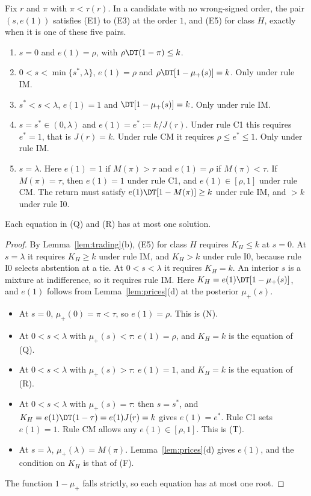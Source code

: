 \begin{lemma}\label{lem:a4-high}
Fix \(r\) and \(\pi\) with \(\pi<\tau(r)\). In a candidate with no wrong-signed order, the pair \((s,e(1))\) satisfies (E1) to (E3) at
the order \(1\), and (E5) for class \(H\), exactly when it is one of these five pairs.
\begin{enumerate}[leftmargin=2.5em]
\item[(N)] \(s=0\) and \(e(1)=\rho\), with \(\rho\DT(1-\pi)\le k\).
\item[(Q)] \(0<s<\min\{s^*,\lambda\}\), \(e(1)=\rho\) and \(\rho\DT[1-\mu_+(s)]=k\). Only under rule IM.
\item[(R)] \(s^*<s<\lambda\), \(e(1)=1\) and \(\DT[1-\mu_+(s)]=k\). Only under rule IM.
\item[(T)] \(s=s^*\in(0,\lambda)\) and \(e(1)=e^*:=k/J(r)\). Under rule C1 this requires \(e^*=1\), that is
\(J(r)=k\). Under rule CM it requires \(\rho\le e^*\le1\). Only under rule IM.
\item[(F)] \(s=\lambda\). Here \(e(1)=1\) if \(M(\pi)>\tau\) and \(e(1)=\rho\) if \(M(\pi)<\tau\). If
\(M(\pi)=\tau\), then \(e(1)=1\) under rule C1, and \(e(1)\in[\rho,1]\) under rule CM. The return must satisfy
\(e(1)\DT[1-M(\pi)]\ge k\) under rule IM, and \(>k\) under rule I0.
\end{enumerate}
Each equation in (Q) and (R) has at most one solution.
\end{lemma}

\begin{proof}
By Lemma~\ref{lem:trading}(b), (E5) for class \(H\) requires \(K_H\le k\) at \(s=0\). At \(s=\lambda\) it requires
\(K_H\ge k\) under rule IM, and \(K_H>k\) under rule I0, because rule I0 selects abstention at a tie. At
\(0<s<\lambda\) it requires \(K_H=k\). An interior \(s\) is a mixture at indifference, so it requires rule IM.
Here \(K_H=e(1)\DT[1-\mu_+(s)]\), and \(e(1)\) follows from Lemma~\ref{lem:prices}(d) at the posterior
\(\mu_+(s)\).
\begin{itemize}[leftmargin=2em]
\item At \(s=0\), \(\mu_+(0)=\pi<\tau\), so \(e(1)=\rho\). This is (N).
\item At \(0<s<\lambda\) with \(\mu_+(s)<\tau\): \(e(1)=\rho\), and \(K_H=k\) is the equation of (Q).
\item At \(0<s<\lambda\) with \(\mu_+(s)>\tau\): \(e(1)=1\), and \(K_H=k\) is the equation of (R).
\item At \(0<s<\lambda\) with \(\mu_+(s)=\tau\): then \(s=s^*\), and \(K_H=e(1)\DT(1-\tau)=e(1)J(r)=k\) gives
\(e(1)=e^*\). Rule C1 sets \(e(1)=1\). Rule CM allows any \(e(1)\in[\rho,1]\). This is (T).
\item At \(s=\lambda\), \(\mu_+(\lambda)=M(\pi)\). Lemma~\ref{lem:prices}(d) gives \(e(1)\), and the condition on
\(K_H\) is that of (F).
\end{itemize}
The function \(1-\mu_+\) falls strictly, so each equation has at most one root.
\end{proof}

